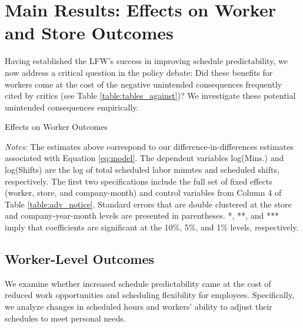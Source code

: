 \documentclass[letterpaper,11pt,leqno]{article}
\theoremstyle{paper}
\newcommand{\note}[2][]{\parbox{\textwidth}{\footnotesize\vspace*{10pt}\textit{#1}#2}}
\begin{document}
\section{Main Results: Effects on Worker and Store Outcomes}

Having established the LFW's success in improving schedule predictability, we now address a critical question in the policy debate: Did these benefits for workers come at the cost of the negative unintended consequences frequently cited by critics (see Table \ref{table:tables_against})? We investigate these potential unintended consequences empirically. 


\begin{singlespace}
\begin{table}[h]
\caption{Effects on Worker Outcomes}

\note{\textit{Notes: } \scriptsize The estimates above correspond to our difference-in-differences estimates associated with Equation \ref{eq:model}. The dependent variables log(Mins.) and log(Shifts) are the log of total scheduled labor minutes and scheduled shifts, respectively.
The first two specifications include the full set of fixed effects (worker, store, and company-month) and control variables from Column 4 of Table \ref{table:adv_notice}. Standard errors that are double clustered at the store and company-year-month levels are presented in parentheses. *, **, and *** imply that coefficients are significant at the 10\%, 5\%, and 1\% levels, respectively.}
\label{table:worker_level}
\end{table}
\end{singlespace}

\subsection{Worker-Level Outcomes} \label{subsec:scheduled_labor}

We examine whether increased schedule predictability came at the cost of reduced work opportunities and scheduling flexibility for employees. Specifically, we analyze changes in scheduled hours and workers' ability to adjust their schedules to meet personal needs.
\end{document}
